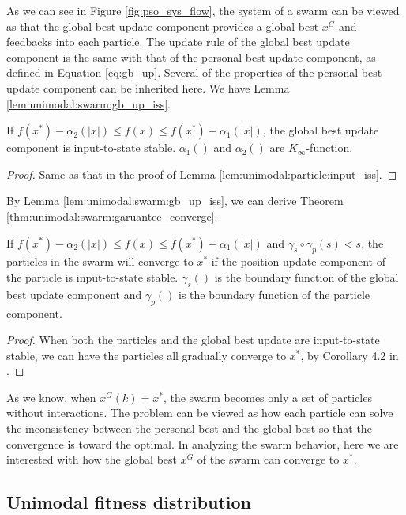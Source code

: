 As we can see in Figure \ref{fig:pso_sys_flow}, the system of a swarm can be viewed as that the global best update component provides a global best $ x^{G} $ and feedbacks into each particle.
The update rule of the global best update component is the same with that of the personal best update component, as defined in Equation \eqref{eq:gb_up}.
Several of the properties of the personal best update component can be inherited here.
We have Lemma \ref{lem:unimodal:swarm:gb_up_iss}.

\begin{mylem}
\label{lem:unimodal:swarm:gb_up_iss}
If $ f(x^{*}) - \alpha_{2} ( |x| ) \leq  f(x) \leq f(x^{*}) - \alpha_{1} ( |x| ) $, the global best update component is input-to-state stable.
$ \alpha_{1} () $ and $ \alpha_{2} () $ are $ K_{\infty} $-function.
\begin{proof}
Same as that in the proof of Lemma \ref{lem:unimodal:particle:input_iss}.
\end{proof}
\end{mylem}

By Lemma \ref{lem:unimodal:swarm:gb_up_iss}, we can derive Theorem \ref{thm:unimodal:swarm:garuantee_converge}.

\begin{mythm}
\label{thm:unimodal:swarm:garuantee_converge}
If $ f(x^{*}) - \alpha_{2} ( |x| ) \leq  f(x) \leq f(x^{*}) - \alpha_{1} ( |x| ) $ and $ \gamma_{s} \circ \gamma_{p} (s)  < s $, the particles in the swarm will converge to $ x^{*} $ if the position-update component of the particle is input-to-state stable.
$ \gamma_{s} () $ is the boundary function of the global best update component and $ \gamma_{p} () $ is the boundary function of the particle component.
\begin{proof}
When both the particles and the global best update are input-to-state stable, we can have the particles all gradually converge to $ x^{*} $, by Corollary 4.2 in \cite{Jiang2001857}.
\end{proof}
\end{mythm}

As we know, when $ x^{G}(k) = x^{*} $, the swarm becomes only a set of particles without interactions.
The problem can be viewed as how each particle can solve the inconsistency between the personal best and the global best so that the convergence is toward the optimal.
In analyzing the swarm behavior, here we are interested with how the global best $ x^{G} $ of the swarm can converge to $ x^{*} $.

\subsection{Unimodal fitness distribution}

